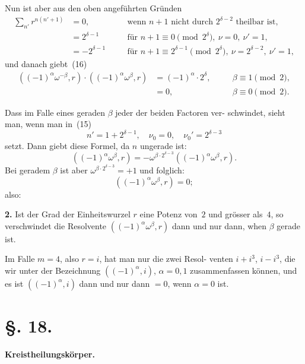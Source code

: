 \documentclass[12pt,a4paper]{article}
\theoremstyle{plain}
\theoremstyle{definition}
\theoremstyle{remark}
\begin{document}
Nun ist aber aus den oben angeführten Gründen
\begin{align*}
\sum_{n'} r^{n(n'+1)} &= 0, &\quad &\text{wenn } n+1 \text{ nicht durch } 2^{\delta-2} \text{ theilbar ist}, \\
&= 2^{\delta-1} &\quad &\text{für } n+1 \equiv 0 \pmod{2^\delta}, \ \nu = 0, \ \nu' = 1, \\
&= -2^{\delta-1} &\quad &\text{für } n+1 \equiv 2^{\delta-1} \pmod{2^\delta}, \ \nu = 2^{\delta-2}, \ \nu' = 1,
\end{align*}
und danach giebt~(16)
\begin{equation}\tag{17}
\begin{aligned}
((-1)^\alpha \omega^{-\beta}, r) \cdot ((-1)^\alpha \omega^\beta, r) &= (-1)^\alpha \cdot 2^\delta, &\quad &\beta \equiv 1 \pmod{2}, \\
&= 0, &\quad &\beta \equiv 0 \pmod{2}.
\end{aligned}
\end{equation}

Dass im Falle eines geraden $\beta$ jeder der beiden Factoren ver-
schwindet, sieht man, wenn man in~(15)
\[
n' = 1 + 2^{\delta-1}, \quad \nu_0 = 0, \quad \nu_0' = 2^{\delta-3}
\]
setzt. Dann giebt diese Formel, da $n$ ungerade ist:
\[
((-1)^\alpha \omega^\beta, r) = -\omega^{\beta \cdot 2^{\delta-3}} ((-1)^\alpha \omega^\beta, r).
\]
Bei geradem $\beta$ ist aber $\omega^{\beta \cdot 2^{\delta-3}} = +1$ und folglich:
\begin{equation}\tag{18}
((-1)^\alpha \omega^\beta, r) = 0;
\end{equation}
also:

\textbf{2.} Ist der Grad der Einheitswurzel $r$ eine Potenz
von~$2$ und grösser als~$4$, so verschwindet die
Resolvente $((-1)^\alpha \omega^\beta, r)$ dann und nur dann,
when $\beta$ gerade ist.

Im Falle $m = 4$, also $r = i$, hat man nur die zwei Resol-
venten $i + i^3$, $i - i^3$, die wir unter der Bezeichnung $((-1)^\alpha, i)$,
$\alpha = 0, 1$ zusammenfassen können, und es ist $((-1)^\alpha, i)$ dann
und nur dann $= 0$, wenn $\alpha = 0$ ist.


\section*{\S. 18.}
\begin{center}
\textbf{Kreistheilungskörper.}
\end{center}
\end{document}
